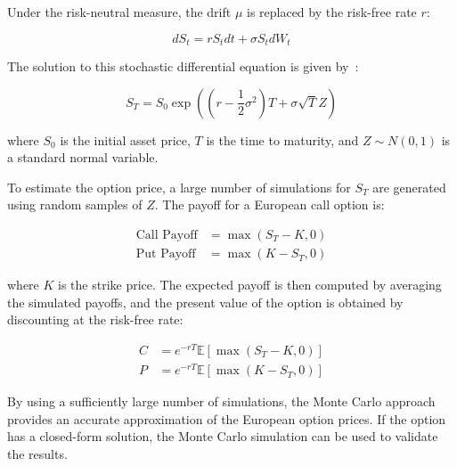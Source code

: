     Under the risk-neutral measure, the drift $\mu$ is replaced by the risk-free rate $r$:

    \begin{equation}
        dS_t = r S_t dt + \sigma S_t dW_t
        \label{eq:geometric_brownian_risk_neutral}
    \end{equation}

    The solution to this stochastic differential equation is given by~\cite{brandimarte_numerical_2006}:

    \begin{equation}
        S_T = S_0 \exp \left( \left( r - \frac{1}{2} \sigma^2 \right) T + \sigma \sqrt{T} Z \right)
        \label{eq:geometric_brownian_solution}
    \end{equation}

    where $S_0$ is the initial asset price, $T$ is the time to maturity,
    and $Z \sim N(0,1)$ is a standard normal variable.

    To estimate the option price, a large number of simulations for $S_T$ are generated using random samples of $Z$.
    The payoff for a European call option is:

    \begin{equation*}
        \begin{aligned}
            \text{Call Payoff} &= \max(S_T - K, 0) \\
            \text{Put Payoff} &= \max(K - S_T, 0)
        \end{aligned}
    \end{equation*}

    where $K$ is the strike price.
    The expected payoff is then computed by averaging the simulated payoffs,
    and the present value of the option is obtained by discounting at the risk-free rate:

    \begin{equation}
        \begin{aligned}
            C &= e^{-rT} \mathbb{E}[\max(S_T - K, 0)] \\
            P &= e^{-rT} \mathbb{E}[\max(K - S_T, 0)]
        \end{aligned}
        \label{eq:monte_carlo_call_put}
    \end{equation}

    By using a sufficiently large number of simulations, the Monte Carlo approach provides an accurate
    approximation of the European option prices.
    If the option has a closed-form solution, the Monte Carlo simulation can be used to validate the results.

